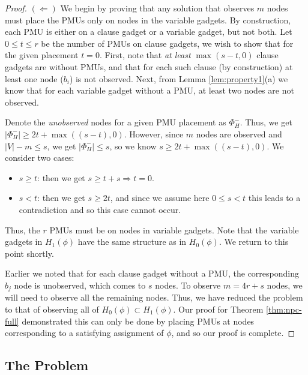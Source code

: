 \begin{proof}
$(\Leftarrow)$
We begin by proving that any solution that observes $m$ nodes must place the PMUs only on nodes in the variable gadgets. By construction, each PMU is either on a clause gadget or a variable gadget, but not both. Let $0\leq t\leq r$ be the number of PMUs on clause gadgets, we wish to show that for the given placement $t=0$. First, note that {\em at least} $\max(s-t,0)$ clause gadgets are without PMUs, and that for each such clause (by construction) at least one node ($b_i$) is not observed. Next, from Lemma \ref{lem:property1}(a) we know that for each variable gadget without a PMU, at least two nodes are not observed.

Denote the {\em unobserved} nodes for a given PMU placement as $\Phi_H^-$. Thus, we get $|\Phi_H^-| \geq 2t + \max((s-t), 0)$. However, since $m$ nodes are observed and  $|V|-m \leq s$, we get $|\Phi_H^-| \leq s$, so we know $s \geq 2t + \max((s-t), 0)$. We consider two cases:
\begin{itemize}
	\item $s\geq t$: then we get $s \geq t + s \Rightarrow t=0.$
	\item $s < t$:	then we get $s \geq 2t$, and since we assume here $0\leq s < t$ this leads to a contradiction and so this case cannot occur.
\end{itemize}

Thus, the $r$ PMUs must be on nodes in variable gadgets. Note that the variable gadgets in $H_1(\phi)$ have the same structure as in $H_0(\phi)$. We return to this point shortly.

Earlier we noted that for each clause gadget without a PMU, the corresponding $b_j$ node is unobserved, which comes to $s$ nodes. To observe $m=4r+s$ nodes, we will need to observe all the remaining nodes. Thus, we have reduced the problem to that of observing all of $H_0(\phi)\subset H_1(\phi)$. Our proof for Theorem \ref{thm:npc-full} demonstrated this can only be done by placing PMUs at nodes corresponding to a satisfying assignment of $\phi$, and so our proof is complete. 
\end{proof}


\subsection{The \xval Problem}
\label{subsec:xval}

